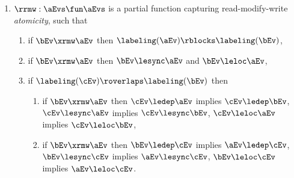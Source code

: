 \begin{definition}
\begin{enumerate}[,label=(\textsc{m}\arabic*),ref=\textsc{m}\arabic*]
\begin{enumerate}
    \end{enumerate}
  \item \label{pom-rmw} 
    ${\rrmw} : \aEvs\fun\aEvs$ is a partial function capturing read-modify-write \emph{atomicity}, such that
    \begin{enumerate}
    \item \label{pom-rmw-block}
      if $\bEv\xrmw\aEv$ then $\labeling(\aEv) \rblocks \labeling(\bEv)$,
    \item \label{pom-rmw-lesync} \label{pom-rmw-leloc}
      if $\bEv\xrmw\aEv$ then $\bEv \lesync \aEv$ and $\bEv \leloc \aEv$,    
    \item \label{pom-rmw-atomic}
      if $\labeling(\cEv)\roverlaps\labeling(\bEv)$ then
      \begin{enumerate}        
      \item \label{pom-rmw-atomic1}
        if $\bEv \xrmw \aEv$ then
        $\cEv\ledep \aEv$ implies $\cEv\ledep \bEv$,
        $\cEv\lesync \aEv$ implies $\cEv\lesync \bEv$,
        $\cEv\leloc \aEv$ implies $\cEv\leloc \bEv$,
      \item \label{pom-rmw-atomic2}
        if $\bEv \xrmw \aEv$ then
        $\bEv\ledep \cEv$ implies $\aEv\ledep \cEv$,
        $\bEv\lesync \cEv$ implies $\aEv\lesync \cEv$,
        $\bEv\leloc \cEv$ implies $\aEv\leloc \cEv$.
      \end{enumerate}
    \end{enumerate}
  \end{enumerate}



\end{definition}
